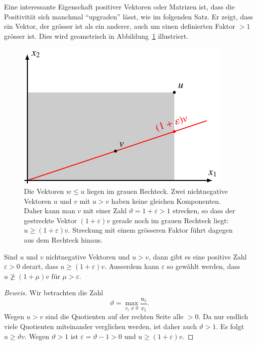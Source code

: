 Eine interessante Eigenschaft positiver Vektoren oder Matrizen
ist, dass die Positivität sich manchmal ``upgraden'' lässt, 
wie im folgenden Satz.
Er zeigt, dass ein Vektor, der grösser ist als ein anderer, auch
um einen definierten Faktor $>1$ grösser ist.
Dies wird geometrisch in 
Abbildung~\ref{buch:wahrscheinlichkeit:figure:trenn} illustriert.

\begin{figure}
\centering
\includegraphics{chapters/80-wahrscheinlichkeit/images/trenn.pdf}
\caption{Die Vektoren $w\le u$ liegen im grauen Rechteck.
Zwei nichtnegative Vektoren $u$ und $v$ mit $u>v$
haben keine gleichen Komponenten.
Daher kann man $v$ mit einer Zahl $\vartheta=1+\varepsilon > 1$
strecken, so dass der gestreckte Vektor $(1+\varepsilon)v$ gerade noch
im grauen Rechteck liegt: $u\ge (1+\varepsilon)v$.
Streckung mit einem grösseren Faktor führt dagegen aus dem Rechteck
hinaus.
\label{buch:wahrscheinlichkeit:figure:trenn}}
\end{figure}

\begin{satz}[Trenntrick]
\label{buch:wahrscheinlichkeit:satz:trenntrick}
Sind $u$ und $v$ nichtnegative Vektoren und $u>v$, dann gibt es eine
positive Zahl $\varepsilon>0$ derart, dass
$u\ge (1+\varepsilon)v$.
Ausserdem kann $\varepsilon$ so gewählt werden, dass $u\not\ge(1+\mu)v$
für $\mu>\varepsilon$.
\end{satz}

\begin{proof}[Beweis]
Wir betrachten die Zahl
\[
\vartheta
=
\max_{v_i\ne 0} \frac{u_i}{v_i}.
\]
Wegen $u>v$ sind die Quotienten auf der rechten Seite alle $>0$.
Da nur endlich viele Quotienten miteinander verglichen werden, ist
daher auch $\vartheta >1$.
Es folgt $u\ge \vartheta v$. 
Wegen $\vartheta >1$ ist $\varepsilon = \vartheta -1 >0$ und
$u\ge (1+\varepsilon)v$.
\end{proof}

